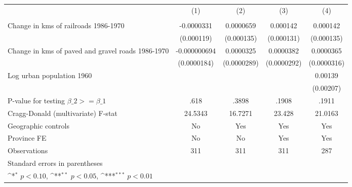 {
\def\sym#1{\ifmmode^{#1}\else\(^{#1}\)\fi}
\begin{tabular}{l*{4}{c}}
\hline\hline
                &\multicolumn{1}{c}{(1)}&\multicolumn{1}{c}{(2)}&\multicolumn{1}{c}{(3)}&\multicolumn{1}{c}{(4)}\\
                &\multicolumn{1}{c}{}&\multicolumn{1}{c}{}&\multicolumn{1}{c}{}&\multicolumn{1}{c}{}\\
\hline
Change in kms of railroads 1986-1970&-0.0000331         &0.0000659         & 0.000142         & 0.000142         \\
                &(0.000119)         &(0.000135)         &(0.000131)         &(0.000135)         \\
[1em]
Change in kms of paved and gravel roads 1986-1970&-0.000000694         &0.0000325         &0.0000382         &0.0000365         \\
                &(0.0000184)         &(0.0000289)         &(0.0000292)         &(0.0000316)         \\
[1em]
Log urban population 1960&                  &                  &                  &  0.00139         \\
                &                  &                  &                  &(0.00207)         \\
\hline
P-value for testing $\beta\_{2} >= \beta\_{1}$&     .618         &    .3898         &    .1908         &    .1911         \\
Cragg-Donald (multivariate) F-stat&  24.5343         &  16.7271         &   23.428         &  21.0163         \\
Geographic controls&       No         &      Yes         &      Yes         &      Yes         \\
Province FE     &       No         &       No         &      Yes         &      Yes         \\
Observations    &      311         &      311         &      311         &      287         \\
\hline\hline
\multicolumn{5}{l}{\footnotesize Standard errors in parentheses}\\
\multicolumn{5}{l}{\footnotesize \sym{*} \(p<0.10\), \sym{**} \(p<0.05\), \sym{***} \(p<0.01\)}\\
\end{tabular}
}
